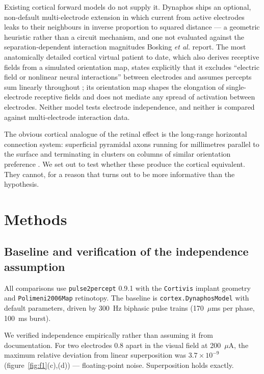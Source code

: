 \documentclass[10pt,twocolumn]{article}
\newcommand{\pptwo}{\texttt{pulse2percept}}
\newcommand{\um}{\ensuremath{\mu\text{m}}}
\newcommand{\uA}{\ensuremath{\mu\text{A}}}
\begin{document}
Existing cortical forward models do not supply it. Dynaphos ships an
optional, non-default multi-electrode extension in which current from active
electrodes leaks to their neighbours in inverse proportion to squared
distance --- a geometric heuristic rather than a circuit mechanism, and one
not evaluated against the separation-dependent interaction magnitudes
Bosking \textit{et al.} report. The most anatomically detailed cortical
virtual patient to date, which also derives receptive fields from a
simulated orientation map, states explicitly that it excludes ``electric
field or nonlinear neural interactions'' between electrodes and assumes
percepts sum linearly throughout \citep{fineboynton2024}; its orientation
map shapes the elongation of single-electrode receptive fields and does not
mediate any spread of activation between electrodes. Neither model tests
electrode independence, and neither is compared against multi-electrode
interaction data.

The obvious cortical analogue of the retinal effect is the long-range
horizontal connection system: superficial pyramidal axons running for
millimetres parallel to the surface and terminating in clusters on columns
of similar orientation preference \citep{gilbert1983,kandel2013}. We set out
to test whether these produce the cortical equivalent. They cannot, for a
reason that turns out to be more informative than the hypothesis.

\section{Methods}

\subsection{Baseline and verification of the independence assumption}

All comparisons use \pptwo{} 0.9.1 with the \texttt{Cortivis} implant
geometry and \texttt{Polimeni2006Map} retinotopy. The baseline is
\texttt{cortex.DynaphosModel} with default parameters, driven by 300~Hz
biphasic pulse trains (170~\um{}s per phase, 100~ms burst).

We verified independence empirically rather than assuming it from
documentation. For two electrodes 0.8\textdegree{} apart in the visual field
at 200~\uA, the maximum relative deviation from linear superposition was
$3.7\times10^{-9}$ (figure~\ref{fig:f1}(c),(d)) --- floating-point noise.
Superposition holds exactly.
\end{document}
